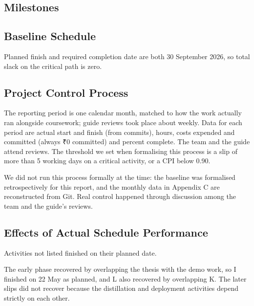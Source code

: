 \subsection{Milestones}


\subsection{Baseline Schedule}
\begin{center}\resizebox{\textwidth}{!}{}\end{center}

Planned finish and required completion date are both 30 September 2026, so total slack on the critical path is zero.

\subsection{Project Control Process}
The reporting period is one calendar month, matched to how the work actually ran alongside coursework; guide reviews took place about weekly. Data for each period are actual start and finish (from commits), hours, costs expended and committed (always ₹0 committed) and percent complete. The team and the guide attend reviews. The threshold we set when formalising this process is a slip of more than 5 working days on a critical activity, or a CPI below 0.90.

We did not run this process formally at the time: the baseline was formalised retrospectively for this report, and the monthly data in Appendix C are reconstructed from Git. Real control happened through discussion among the team and the guide's reviews.

\subsection{Effects of Actual Schedule Performance}
Activities not listed finished on their planned date.



The early phase recovered by overlapping the thesis with the demo work, so I finished on 22 May as planned, and L also recovered by overlapping K. The later slips did not recover because the distillation and deployment activities depend strictly on each other.

